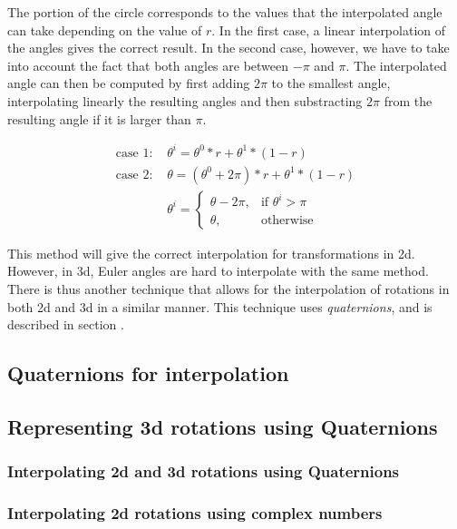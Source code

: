 
		The  portion of the circle corresponds to the values that the interpolated angle can take depending on the value of \( r \). In the first case, a linear interpolation of the angles gives the correct result. In the second case, however, we have to take into account the fact that  both angles are between \( -\pi \) and \( \pi \). The interpolated angle can then be computed by first adding \( 2\pi \) to the smallest angle, interpolating linearly the resulting angles and then substracting \( 2\pi \) from the resulting angle if it is larger than \( \pi \).

		\begin{equation}
		\begin{split}
			\text{case } 1: \, & \theta^i = \theta^0 * r + \theta^1 * (1-r) \\
			\text{case } 2: \, & \theta = (\theta^0 + 2\pi) * r + \theta^1 * (1-r) \\
						   	    & \theta^i = 
									\begin{cases}
										\theta - 2\pi, & \text{if } \theta^i > \pi\\
										\theta,         & \text{otherwise}
									\end{cases}
		\end{split}
		\end{equation}

		This method will give the correct interpolation for transformations in 2d. However, in 3d, Euler angles are hard to interpolate with the same method. There is thus another technique that allows for the interpolation of rotations in both 2d and 3d in a similar manner. This technique uses \textit{quaternions}, and is described in section .

			
	\subsection{Quaternions for interpolation}
	
		\subsection{Representing 3d rotations using Quaternions}
			
		\subsubsection{Interpolating 2d and 3d rotations using Quaternions}
			
		\subsubsection{Interpolating 2d rotations using complex numbers}
			
			










